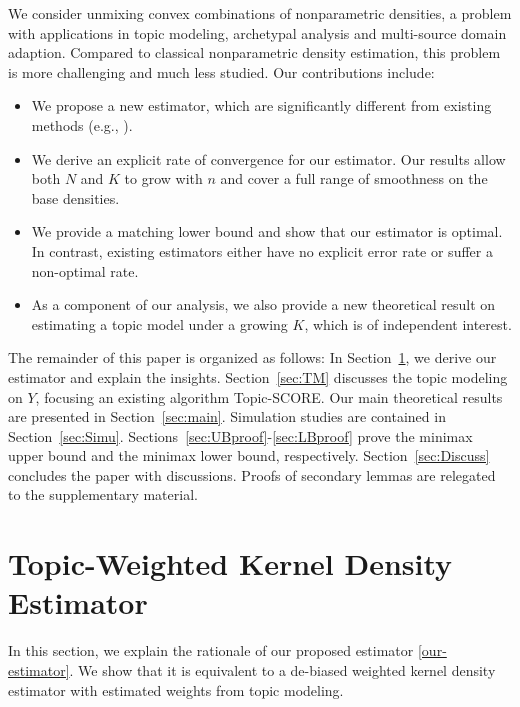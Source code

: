 \documentclass[preprint,11pt]{article}
\numberwithin{equation}{section}
\begin{document}
We consider unmixing convex combinations of nonparametric densities, a problem with applications in topic modeling, archetypal analysis and multi-source domain adaption. Compared to classical nonparametric density estimation, this problem is more challenging and much less studied. Our contributions include:
\begin{itemize}
\item We propose a new estimator, which are significantly different from existing methods (e.g., \cite{katz2019decontamination, austern2025poisson}).
\item We derive an explicit rate of convergence for our estimator. Our results allow both $N$ and $K$ to grow with $n$ and cover a full range of smoothness on the base densities. 
\item We provide a matching lower bound and show that our estimator is optimal. In contrast, existing estimators either have no explicit error rate or suffer a non-optimal rate.  
\item As a component of our analysis, we also provide a new theoretical result on estimating a topic model under a growing $K$, which is of independent interest. 
\end{itemize}

The remainder of this paper is organized as follows: 
In Section~\ref{sec:Method}, we derive our estimator and explain the insights. Section~\ref{sec:TM} discusses the topic modeling on $Y$, focusing an existing algorithm Topic-SCORE. 
Our main theoretical results are presented in Section~\ref{sec:main}. 
Simulation studies are contained in Section~\ref{sec:Simu}.  
Sections~\ref{sec:UBproof}-\ref{sec:LBproof} prove the minimax upper bound and the minimax lower bound, respectively. Section~\ref{sec:Discuss} concludes the paper with discussions. Proofs of secondary lemmas are relegated to the supplementary material.



\section{Topic-Weighted Kernel Density Estimator} \label{sec:Method}

In this section, we explain the rationale of our proposed estimator \eqref{our-estimator}.  We show that it is equivalent to a de-biased weighted kernel density estimator with estimated weights from topic modeling.   
\end{document}
